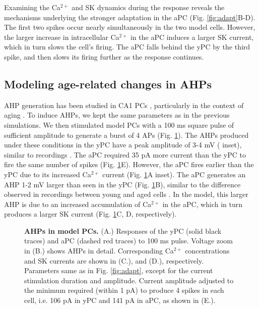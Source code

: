 \documentclass[10pt,letterpaper]{article}
\newcommand{\Ca}{Ca$^{2+}$}
\begin{document}
Examining the {\Ca} and SK dynamics during the response reveals the mechanisms underlying the stronger adaptation in the aPC (Fig. \ref{fig:adapt}B-D). The first two spikes occur nearly simultaneously in the two model cells. However, the larger increase in intracellular {\Ca} in the aPC induces a larger SK current, which in turn slows the cell's firing. The aPC falls behind the yPC by the third spike, and then slows its firing further as the response continues.

\subsection*{Modeling age-related changes in AHPs}

AHP generation has been studied in CA1 PCs \cite{storm1989after}, particularly in the context of aging  \cite{disterhoft1996calcium,gant2006early,matthews2009fast,moyer1992nimodipine}. To induce AHPs, we kept the same parameters as in the previous simulations. We then stimulated model PCs with a 100 ms square pulse of sufficient amplitude to generate a burst of 4 APs (Fig. \ref{fig:AHP}). The AHPs produced under these conditions in the yPC have a peak amplitude of 3-4 mV ( inset), similar to recordings \cite{matthews2009fast,power2002age}. The aPC required 35 pA more current than the yPC to fire the same number of spikes (Fig. \ref{fig:AHP}E). However, the aPC fires earlier than the yPC due to its increased {\Ca} current (Fig. \ref{fig:AHP}A inset). The aPC generates an AHP 1-2 mV larger than seen in the yPC (Fig. \ref{fig:AHP}B), similar to the difference observed in recordings between young and aged cells \cite{moyer1992nimodipine,gant2006early,power2002age}. In the model, this larger AHP is due to an increased accumulation of {\Ca} in the aPC, which in turn produces a larger SK current (Fig. \ref{fig:AHP}C, D, respectively).

\begin{figure}[h!]
\centering
\caption{{\bf AHPs in model PCs.}
(A.) Responses of the yPC (solid black traces) and aPC (dashed red traces) to 100 ms pulse. Voltage zoom in (B.) shows AHPs in detail. Corresponding {\Ca} concentrations and SK currents are shown in (C.), and (D.), respectively. Parameters same as in Fig. \ref{fig:adapt}, except for the current stimulation duration and amplitude. Current amplitude adjusted to the minimum required (within 1 pA) to produce 4 spikes in each cell, i.e. 106 pA in yPC and 141 pA in aPC, as shown in (E.).}
\label{fig:AHP}
\end{figure}
\end{document}
